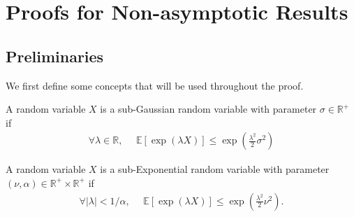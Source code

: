 \documentclass[10pt]{article}
\numberwithin{equation}{section}
\begin{document}
\section{Proofs for Non-asymptotic Results}
\label{sec:proof-nonasymptotic}

\subsection{Preliminaries}

We first define some concepts that will be used throughout the proof.

\begin{definition}
A random variable $X$ is a sub-Gaussian random variable with parameter $\sigma \in \mathbb{R}^+$ if 
\begin{align*}
    \forall \lambda \in \mathbb{R}, ~~~~~~ \mathbb{E} \left[\exp(\lambda X)\right] \le \exp\left(\frac{\lambda^2}{2}\sigma^2\right)
\end{align*}
\end{definition}

\begin{definition}
    A random variable $X$ is a sub-Exponential random variable with parameter $(\nu,\alpha) \in \mathbb{R}^+ \times \mathbb{R}^+$ if
    \begin{align*}
        \forall |\lambda|<1/\alpha, ~~~~~~ \mathbb{E}\left[\exp(\lambda X)\right] \le \exp\left(\frac{\lambda^2}{2} \nu^2\right).
    \end{align*}
\end{definition}
\end{document}
